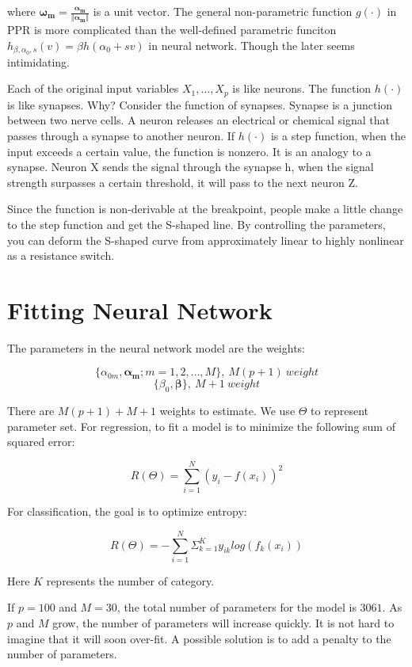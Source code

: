 \documentclass[]{book}
\theoremstyle{definition}
\theoremstyle{definition}
\theoremstyle{remark}
\begin{document}
where
\(\mathbf{\omega_{m}=\frac{\mathbf{\alpha_{m}}}{\Vert\mathbf{\alpha_{m}}\Vert}}\)
is a unit vector. The general non-parametric function \(g(\cdot)\) in
PPR is more complicated than the well-defined parametric funciton
\(h_{\beta,\alpha_{0},s}(v)=\beta h(\alpha_{0}+sv)\) in neural network.
Though the later seems intimidating.

Each of the original input variables \(X_1,\dots, X_p\) is like neurons.
The function \(h(\cdot)\) is like synapses. Why? Consider the function
of synapses. Synapse is a junction between two nerve cells. A neuron
releases an electrical or chemical signal that passes through a synapse
to another neuron. If \(h(\cdot)\) is a step function, when the input
exceeds a certain value, the function is nonzero. It is an analogy to a
synapse. Neuron X sends the signal through the synapse h, when the
signal strength surpasses a certain threshold, it will pass to the next
neuron Z.

Since the function is non-derivable at the breakpoint, people make a
little change to the step function and get the S-shaped line. By
controlling the parameters, you can deform the S-shaped curve from
approximately linear to highly nonlinear as a resistance switch.

\section{Fitting Neural Network}\label{fitting-neural-network}

The parameters in the neural network model are the weights:

\[\{\alpha_{0m},\mathbf{\alpha_{m}};m=1,2,\dots,M\},\ M(p+1)\ weight\]
\[\{\beta_{0},\mathbf{\beta}\},\ M+1\ weight\]

There are \(M(p+1)+M+1\) weights to estimate. We use \(\Theta\) to
represent parameter set. For regression, to fit a model is to minimize
the following sum of squared error:

\[R(\Theta)=\sum_{i=1}^{N}(y_{i}-f(x_{i}))^{2}\]

For classification, the goal is to optimize entropy:

\[R(\Theta)=-\sum_{i=1}^{N}\Sigma_{k=1}^{K}y_{ik}log(f_{k}(x_{i}))\]

Here \(K\) represents the number of category.

If \(p=100\) and \(M = 30\), the total number of parameters for the
model is \(3061\). As \(p\) and \(M\) grow, the number of parameters
will increase quickly. It is not hard to imagine that it will soon
over-fit. A possible solution is to add a penalty to the number of
parameters.
\end{document}

